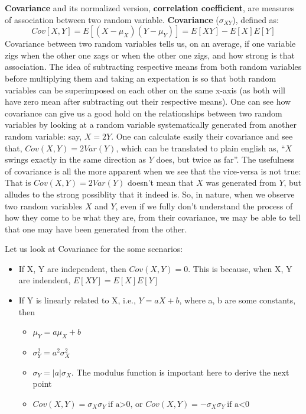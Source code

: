 \textbf{Covariance} and its normalized version, \textbf{correlation coefficient}, are measures of association between two random variable.  \textbf{Covariance} ($\sigma_{XY}$), defined as:
	\[ Cov[X,Y] = E[(X-\mu_X)(Y-\mu_Y)] = E[XY] - E[X]E[Y]\] 
Covariance between two random variables tells us, on an average, if one variable zigs when the other one zags or when the other one zigs, and how strong is that association. The idea of subtracting respective means from both random variables before multiplying them and taking an expectation is so that both random variables can be superimposed on each other on the same x-axis (as both will have zero mean after subtracting out their respective means). One can see how covariance can give us a good hold on the relationships between two random variables by looking at a random variable systematically generated from another random variable: say, $X=2Y$. One can calculate easily their covariance and see that, \( Cov(X,Y) = 2Var(Y) \), which can be translated to plain english as, ``$X$ swings exactly in the same direction as $Y$ does, but twice as far''. The usefulness of covariance is all the more apparent when we see that the vice-versa is not true: That is \( Cov(X,Y) = 2Var(Y) \) doesn't mean that $X$ was generated from $Y$, but alludes to the strong possiblity that it indeed is. So, in nature, when we observe two random variables $X$ and $Y$, even if we fully don't understand the process of how they come to be what they are, from their covariance, we may be able to tell that one may have been generated from the other. 

Let us look at Covariance for the some scenarios:
	\begin{itemize}
	\item If X, Y are independent, then \( Cov(X,Y) = 0 \). This is because, when X, Y are indendent, \( E[XY] = E[X]E[Y] \)
	\item If Y is linearly related to X, i.e., \( Y = aX+b \), where a, b are some constants, then 
		\begin{itemize}
		\item \( \mu_Y = a\mu_X + b \)
		\item \( \sigma^2_Y = a^2 \sigma^2_X \)
		\item \( \sigma_Y = |a|\sigma_X \). The modulus function is important here to derive the next point
		\item \( Cov(X,Y) = \sigma_X \sigma_Y\ \text{if a>0, or } Cov(X,Y) = -\sigma_X \sigma_Y\ \text{if a<0} \)
		\end{itemize}
	\end{itemize}

